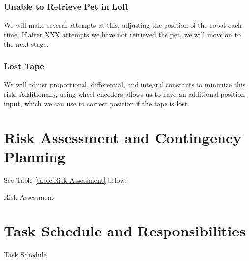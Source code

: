 \documentclass[11pt, oneside]{article} %
\begin{document}
		\subsubsection{Unable to Retrieve Pet in Loft}
		We will make several attempts at this, adjusting the position of the robot each time. If after XXX attempts we have not retrieved the pet, we will move on to the next stage.
		\subsubsection{Lost Tape}
		We will adjust proportional, differential, and integral constants to minimize this risk. Additionally, using wheel encoders allows us to have an additional position input, which we can use to correct position if the tape is lost.


\section{Risk Assessment and Contingency Planning}

See Table \ref{table:Risk Assessment} below:

\begin{table}
	\caption{Risk Assessment}
	\centering
	\label{table:Risk Assessment}
\end{table}


\section{Task Schedule and Responsibilities}

\begin{table}
	\caption{Task Schedule}
	\centering
	\label{table:Task Schedule}
\end{table}


\end{document}
